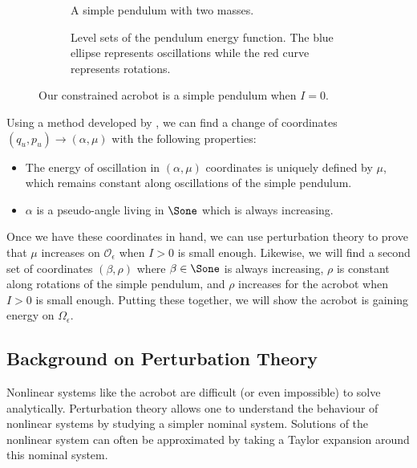 \begin{figure}
    \centering
    \begin{subfigure}[t]{0.45\textwidth}
        \caption{A simple pendulum with two masses.}
        \label{fig:acrobot-I0}
    \end{subfigure}
    \hfill
    \begin{subfigure}[t]{0.45\textwidth}
        \caption{Level sets of the pendulum energy function.
            The blue ellipse represents oscillations while the red curve
            represents rotations.}
        \label{fig:pendulum-level-sets}
    \end{subfigure}
    \caption{Our constrained acrobot is a simple pendulum when \(I = 0\).}
\end{figure}

Using a method developed by \citet{dynamic_vhcs_stabilize_closed_orbits},
we can find a change of coordinates \((q_u,p_u) \to (\alpha, \mu)\) with the
following properties:
\begin{itemize}
    \item The energy of oscillation in \((\alpha,\mu)\) coordinates is 
        uniquely defined by \(\mu\), which remains constant along oscillations
        of the simple pendulum.
    \item \(\alpha\) is a pseudo-angle living in \(\Sone\) which is
        always increasing.
\end{itemize}
Once we have these coordinates in hand, we can use perturbation theory to prove
that \(\mu\) increases on \(\mathcal{O}_\epsilon\) when \(I > 0\) is small enough.
Likewise, we will find a second set of coordinates \((\beta, \rho)\) where
\(\beta \in \Sone\) is always increasing, \(\rho\) is constant along
rotations of the simple pendulum, and \(\rho\) increases for the acrobot when
\(I > 0\) is small enough.
Putting these together, we will show the acrobot is gaining energy on
\(\Omega_\epsilon\).

\subsection*{Background on Perturbation Theory}
Nonlinear systems like the acrobot are difficult (or even impossible) to solve
analytically.
Perturbation theory allows one to understand the behaviour of nonlinear systems
by studying a simpler nominal system. 
Solutions of the nonlinear system can often be approximated by taking a Taylor
expansion around this nominal system.

